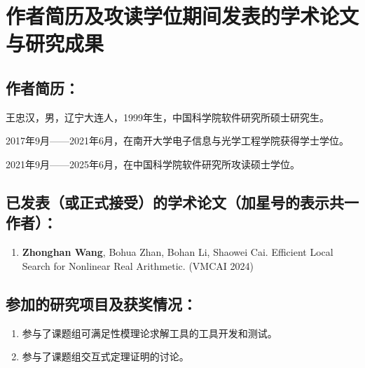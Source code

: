 \chapter{作者简历及攻读学位期间发表的学术论文与研究成果}

\section*{作者简历：}

王忠汉，男，辽宁大连人，1999年生，中国科学院软件研究所硕士研究生。

2017年9月——2021年6月，在南开大学电子信息与光学工程学院获得学士学位。

2021年9月——2025年6月，在中国科学院软件研究所攻读硕士学位。

\section*{已发表（或正式接受）的学术论文（加星号的表示共一作者）：}

{
\setlist[enumerate]{}%
\begin{enumerate}[nosep]
    \item \textbf{Zhonghan Wang}, Bohua Zhan, Bohan Li, Shaowei Cai. Efficient Local Search for Nonlinear Real Arithmetic. (VMCAI 2024)
\end{enumerate}
}



\section*{参加的研究项目及获奖情况：}

\begin{enumerate}
    \item 参与了课题组可满足性模理论求解工具的工具开发和测试。
    \item 参与了课题组交互式定理证明的讨论。
\end{enumerate}

\cleardoublepage[plain]%
